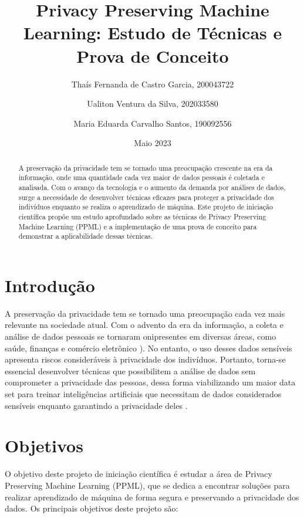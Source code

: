 \documentclass{article}
\begin{document}
\title{Privacy Preserving Machine Learning: Estudo de Técnicas e Prova de Conceito}
\author{Thaís Fernanda de Castro Garcia, 200043722}
\author{Ualiton Ventura da Silva, 202033580}
\author{Maria Eduarda Carvalho Santos, 190092556}
\date{Maio 2023}

\maketitle

\begin{abstract}
A preservação da privacidade tem se tornado uma preocupação crescente na era da informação, onde uma quantidade cada vez maior de dados pessoais é coletada e analisada. Com o avanço da tecnologia e o aumento da demanda por análises de dados, surge a necessidade de desenvolver técnicas eficazes para proteger a privacidade dos indivíduos enquanto se realiza o aprendizado de máquina. Este projeto de iniciação científica propõe um estudo aprofundado sobre as técnicas de Privacy Preserving Machine Learning (PPML) e a implementação de uma prova de conceito para demonstrar a aplicabilidade dessas técnicas.
\end{abstract}

\section{Introdução}
A preservação da privacidade tem se tornado uma preocupação cada vez mais relevante na sociedade atual. Com o advento da era da informação, a coleta e análise de dados pessoais se tornaram onipresentes em diversas áreas, como saúde, finanças e comércio eletrônico \cite{boulemtafes2020review}). No entanto, o uso desses dados sensíveis apresenta riscos consideráveis à privacidade dos indivíduos. Portanto, torna-se essencial desenvolver técnicas que possibilitem a análise de dados sem comprometer a privacidade das pessoas, dessa forma viabilizando um maior data set para treinar inteligências artificiais que necessitam de dados considerados sensíveis enquanto garantindo a privacidade deles \cite{chamikara2020efficient}.

\section{Objetivos}
O objetivo deste projeto de iniciação científica é estudar a área de Privacy Preserving Machine Learning (PPML), que se dedica a encontrar soluções para realizar aprendizado de máquina de forma segura e preservando a privacidade dos dados. Os principais objetivos deste projeto são:
\end{document}
